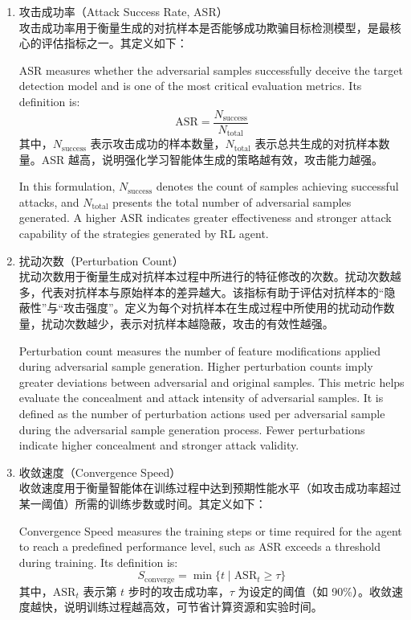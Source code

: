 \begin{enumerate}[label=\arabic*)]
	\item 攻击成功率（Attack Success Rate, ASR） \\
	攻击成功率用于衡量生成的对抗样本是否能够成功欺骗目标检测模型，是最核心的评估指标之一。其定义如下：

    ASR measures whether the adversarial samples successfully deceive the target detection model and is one of the most critical evaluation metrics. Its definition is:
	\begin{equation}
		\text{ASR} = \frac{N_{\text{success}}}{N_{\text{total}}}
		\tag{5.5}
	\end{equation}
	其中，$N_{\text{success}}$ 表示攻击成功的样本数量，$N_{\text{total}}$ 表示总共生成的对抗样本数量。ASR 越高，说明强化学习智能体生成的策略越有效，攻击能力越强。

    In this formulation, $N_{\text{success}}$ denotes the count of samples achieving successful attacks, and $N_{\text{total}}$ presents the total number of adversarial samples generated. A higher ASR indicates greater effectiveness and stronger attack capability of the strategies generated by RL agent.
	
	\item 扰动次数（Perturbation Count） \\
	扰动次数用于衡量生成对抗样本过程中所进行的特征修改的次数。扰动次数越多，代表对抗样本与原始样本的差异越大。该指标有助于评估对抗样本的“隐蔽性”与“攻击强度”。定义为每个对抗样本在生成过程中所使用的扰动动作数量，扰动次数越少，表示对抗样本越隐蔽，攻击的有效性越强。

    Perturbation count measures the number of feature modifications applied during adversarial sample generation. Higher perturbation counts imply greater deviations between adversarial and original samples. This metric helps evaluate the concealment and attack intensity of adversarial samples. It is defined as the number of perturbation actions used per adversarial sample during the adversarial sample generation process. Fewer perturbations indicate higher concealment and stronger attack validity.
	
	\item 收敛速度（Convergence Speed）\\
	收敛速度用于衡量智能体在训练过程中达到预期性能水平（如攻击成功率超过某一阈值）所需的训练步数或时间。其定义如下：

    Convergence Speed measures the training steps or time required for the agent to reach a predefined performance level, such as ASR exceeds a threshold during training. Its definition is:
	\begin{equation}
		S_{\text{converge}} = \min\{t \mid \text{ASR}_t \geq \tau\}
		\tag{5.6}
	\end{equation}
	其中，$\text{ASR}_t$ 表示第 $t$ 步时的攻击成功率，$\tau$ 为设定的阈值（如 90\%）。收敛速度越快，说明训练过程越高效，可节省计算资源和实验时间。


\end{enumerate}
